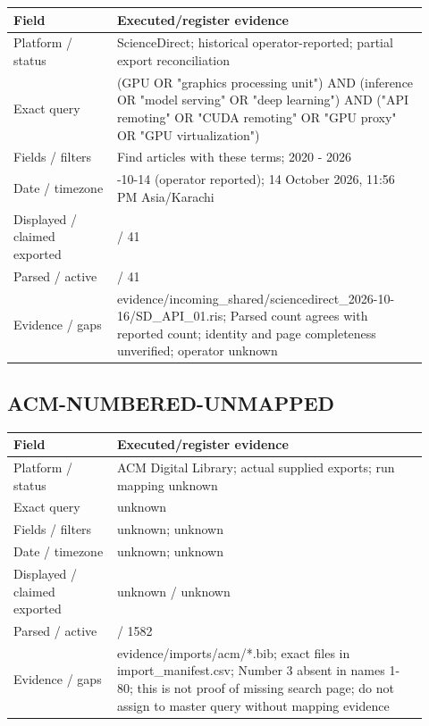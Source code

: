 \documentclass[12pt,a4paper]{article}
\begin{document}
{\small\begin{longtable}{>{\raggedright\arraybackslash}p{0.23\linewidth}>{\raggedright\arraybackslash}p{0.69\linewidth}}
\toprule
Field & Executed/\allowbreak{}register evidence\\\midrule
\endhead
Platform /\allowbreak{} status & ScienceDirect; historical operator-reported; partial export reconciliation\\
Exact query & (GPU OR "graphics processing unit") AND (inference OR "model serving" OR "deep learning") AND ("API remoting" OR "CUDA remoting" OR "GPU proxy" OR "GPU virtualization")\\
Fields /\allowbreak{} filters & Find articles with these terms; 2020 - 2026\\
Date /\allowbreak{} timezone & 2026-10-14 (operator reported); 14 October 2026, 11:\allowbreak{}56 PM Asia/\allowbreak{}Karachi\\
Displayed /\allowbreak{} claimed exported & 41 /\allowbreak{} 41\\
Parsed /\allowbreak{} active & 41 /\allowbreak{} 41\\
Evidence /\allowbreak{} gaps & evidence/\allowbreak{}incoming\_\allowbreak{}shared/\allowbreak{}sciencedirect\_\allowbreak{}2026-10-16/\allowbreak{}SD\_\allowbreak{}API\_\allowbreak{}01.ris; Parsed count agrees with reported count; identity and page completeness unverified; operator unknown\\
\bottomrule
\end{longtable}}

\subsection*{ACM-NUMBERED-UNMAPPED}

{\small\begin{longtable}{>{\raggedright\arraybackslash}p{0.23\linewidth}>{\raggedright\arraybackslash}p{0.69\linewidth}}
\toprule
Field & Executed/\allowbreak{}register evidence\\\midrule
\endhead
Platform /\allowbreak{} status & ACM Digital Library; actual supplied exports; run mapping unknown\\
Exact query & unknown\\
Fields /\allowbreak{} filters & unknown; unknown\\
Date /\allowbreak{} timezone & unknown; unknown\\
Displayed /\allowbreak{} claimed exported & unknown /\allowbreak{} unknown\\
Parsed /\allowbreak{} active & 1582 /\allowbreak{} 1582\\
Evidence /\allowbreak{} gaps & evidence/\allowbreak{}imports/\allowbreak{}acm/\allowbreak{}*.bib; exact files in import\_\allowbreak{}manifest.csv; Number 3 absent in names 1-80; this is not proof of missing search page; do not assign to master query without mapping evidence\\
\bottomrule
\end{longtable}}
\end{document}
